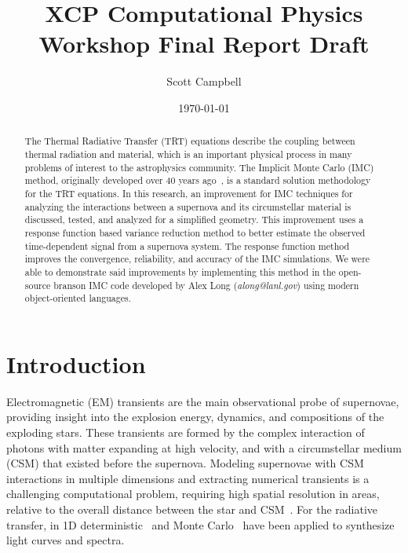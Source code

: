 \documentclass[]{article}
\begin{document}
	\title{XCP Computational Physics Workshop Final Report Draft}
	\author{Scott Campbell}
	\date{\today}
	
	\maketitle

\begin{abstract}
	The Thermal Radiative Transfer (TRT) equations describe the coupling between thermal radiation and material, which is an important physical process in many problems of interest to the astrophysics community. The Implicit Monte Carlo (IMC) method, originally developed over 40 years ago~\cite{FC71}, is a standard solution methodology for the TRT equations. In this research, an improvement for IMC techniques for analyzing the interactions between a supernova and its circumstellar material is discussed, tested, and analyzed for a simplified geometry. This improvement uses a response function based variance reduction method to better estimate the observed time-dependent signal from a supernova system. The response function method improves the convergence, reliability, and accuracy of the IMC simulations. We were able to demonstrate said improvements by implementing this method in the open-source branson IMC code developed by Alex Long (\textit{along@lanl.gov}) using modern object-oriented languages.
\end{abstract}

\newpage

\section{Introduction}

 	 Electromagnetic (EM) transients are the main observational probe of supernovae, providing insight into the explosion energy, dynamics, and compositions of the exploding stars. These transients are formed by the complex interaction of photons with matter expanding at high velocity, and with a circumstellar medium (CSM) that existed before the supernova. Modeling supernovae with CSM interactions in multiple dimensions and extracting numerical transients is a challenging computational problem, requiring high spatial resolution in areas, relative to the overall distance between the star and CSM~\cite{MS10,MB13}. For the radiative transfer, in 1D deterministic~\cite{MB13} and Monte Carlo~\cite{KW09} have been applied to synthesize light curves and spectra.
  
\end{document}
